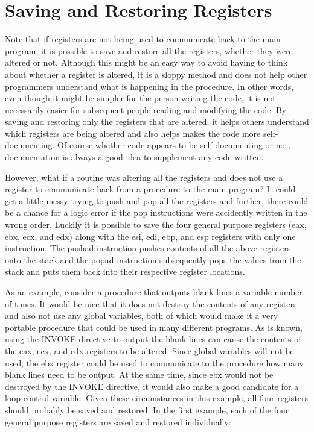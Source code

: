 \documentclass[10pt]{book}
\begin{document}
\section{Saving and Restoring Registers}
Note that if registers are not being used to communicate back to the main program, it is possible to save and restore all the registers, whether they were altered or not. Although this might be an easy way to avoid having to think about whether a register is altered, it is a sloppy method and does not help other programmers understand what is happening in the procedure. In other words, even though it might be simpler for the person writing the code, it is not necessarily easier for subsequent people reading and modifying the code. By saving and restoring only the registers that are altered, it helps others understand which registers are being altered and also helps makes the code more self-documenting. Of course whether code appears to be self-documenting or not, documentation is always a good idea to supplement any code written.

However, what if a routine was altering all the registers and does not use a register to communicate back from a procedure to the main program? It could get a little messy trying to push and pop all the registers and further, there could be a chance for a logic error if the pop instructions were accidently written in the wrong order. Luckily it is possible to save the four general purpose registers (eax, ebx, ecx, and edx) along with the esi, edi, ebp, and esp registers with only one instruction. The pushad instruction pushes contents of all the above registers onto the stack and the popad instruction subsequently pops the values from the stack and puts them back into their respective register locations.

As an example, consider a procedure that outputs blank lines a variable number of times. It would be nice that it does not destroy the contents of any registers and also not use any global variables, both of which would make it a very portable procedure that could be used in many different programs. As is known, using the INVOKE directive to output the blank lines can cause the contents of the eax, ecx, and edx registers to be altered. Since global variables will not be used, the ebx register could be used to communicate to the procedure how many blank lines need to be output. At the same time, since ebx would not be destroyed by the INVOKE directive, it would also make a good candidate for a loop control variable. Given these circumstances in this example, all four registers should probably be saved and restored. In the first example, each of the four general purpose registers are saved and restored individually:
\end{document}
